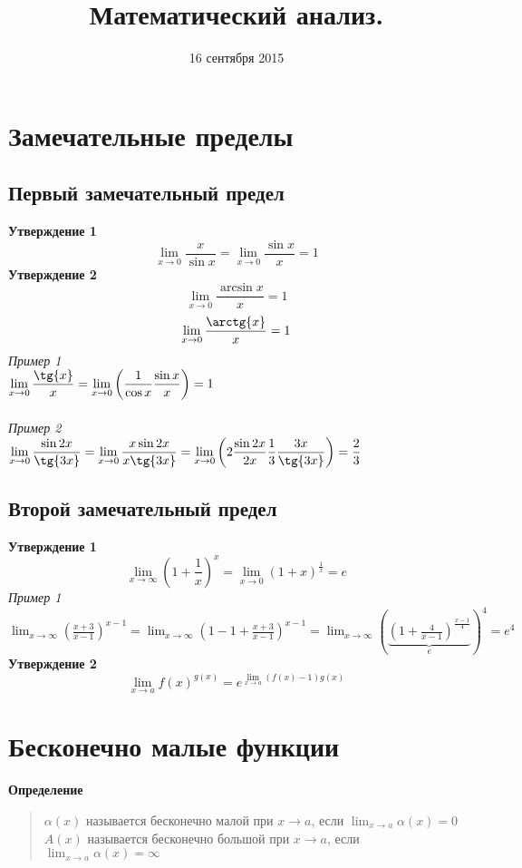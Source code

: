 \documentclass[11pt]{article}
\title{Математический анализ.}
\date{16 сентября 2015}
\begin{document}
\pagestyle{empty}
\maketitle

\section{Замечательные пределы}

\subsection{Первый замечательный предел}
\textbf{Утверждение 1}
\[\boxed{\lim_{x\rightarrow0}\frac{x}{\sin{x}}=\lim_{x\rightarrow0}\frac{\sin{x}}{x}=1}\]
\textbf{Утверждение 2}
\[\lim_{x\rightarrow0}\frac{\arcsin{x}}{x}=1\]
\[\lim_{x\rightarrow0}\frac{\arctg{x}}{x}=1\]
\textsl{Пример 1}\\
$\displaystyle\lim_{x\rightarrow0}\frac{\tg{x}}{x}=\lim_{x\rightarrow0}\left(\frac{1}{\cos{x}}\frac{\sin{x}}{x}\right)=1$\\\\
\textsl{Пример 2}\\
$\displaystyle\lim_{x\rightarrow0}\frac{\sin{2x}}{\tg{3x}}=\lim_{x\rightarrow0}\frac{x\sin{2x}}{x\tg{3x}}=
\lim_{x\rightarrow0}\left(2\frac{\sin{2x}}{2x}\frac13\frac{3x}{\tg{3x}}\right)=\frac23$

\subsection{Второй замечательный предел}
\textbf{Утверждение 1}
\[\boxed{\lim_{x\rightarrow\infty}\left(1+\frac1x\right)^x=\lim_{x\rightarrow0}\left(1+x\right)^{\frac1x}=e}\]
\textsl{Пример 1}\\
$\displaystyle\lim_{x\rightarrow\infty}\left(\frac{x+3}{x-1}\right)^{x-1}=\lim_{x\rightarrow\infty}\left(1-1+\frac{x+3}{x-1}\right)^{x-1}
=\lim_{x\rightarrow\infty}\left(\underbrace{\left(1+\frac{4}{x-1}\right)^{\frac{x-1}{4}}}_{e}\right)^4=e^4$\\
\textbf{Утверждение 2}
\[\boxed{\lim_{x\rightarrow a}f(x)^{g(x)}=e^{\lim_{x\rightarrow a}(f(x)-1)g(x)}}\]

\section{Бесконечно малые функции}
\textbf{Определение}
\begin{quote}
  $\alpha(x)$ называется бесконечно малой при $x \rightarrow a$, если $\displaystyle\lim_{x \rightarrow a}\alpha(x)=0$\\
  $A(x)$ называется бесконечно большой при $x \rightarrow a$, если $\displaystyle\lim_{x \rightarrow a}\alpha(x)=\infty$
\end{quote}
\end{document}
